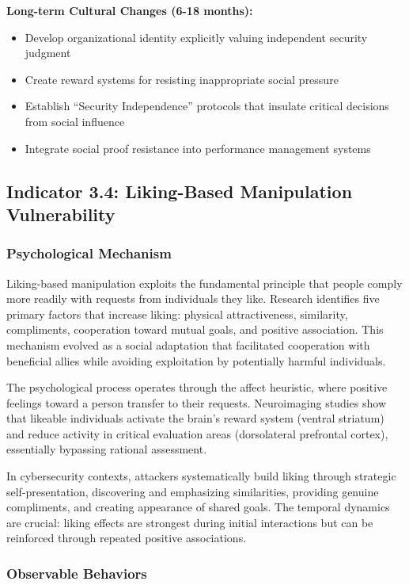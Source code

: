 \documentclass[11pt,a4paper]{article}
\begin{document}
\textbf{Long-term Cultural Changes (6-18 months):}
\begin{itemize}
\item Develop organizational identity explicitly valuing independent security judgment
\item Create reward systems for resisting inappropriate social pressure
\item Establish ``Security Independence'' protocols that insulate critical decisions from social influence
\item Integrate social proof resistance into performance management systems
\end{itemize}

\subsection{Indicator 3.4: Liking-Based Manipulation Vulnerability}

\subsubsection{Psychological Mechanism}

Liking-based manipulation exploits the fundamental principle that people comply more readily with requests from individuals they like. Research identifies five primary factors that increase liking: physical attractiveness, similarity, compliments, cooperation toward mutual goals, and positive association\cite{cialdini2007}. This mechanism evolved as a social adaptation that facilitated cooperation with beneficial allies while avoiding exploitation by potentially harmful individuals.

The psychological process operates through the affect heuristic, where positive feelings toward a person transfer to their requests\cite{slovic2004}. Neuroimaging studies show that likeable individuals activate the brain's reward system (ventral striatum) and reduce activity in critical evaluation areas (dorsolateral prefrontal cortex), essentially bypassing rational assessment\cite{knutson2007}.

In cybersecurity contexts, attackers systematically build liking through strategic self-presentation, discovering and emphasizing similarities, providing genuine compliments, and creating appearance of shared goals. The temporal dynamics are crucial: liking effects are strongest during initial interactions but can be reinforced through repeated positive associations.

\subsubsection{Observable Behaviors}
\end{document}
